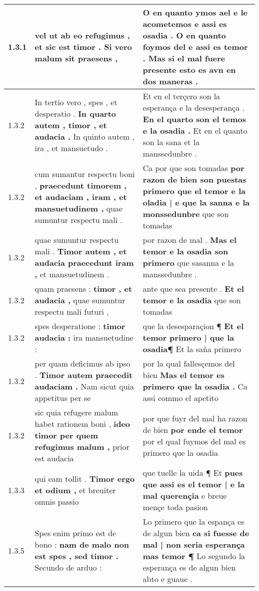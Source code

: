 \begin{tabular}{|p{1cm}|p{6.5cm}|p{6.5cm}|}
1.3.1 & vel ut ab eo refugimus , \textbf{ et sic est timor . } Si vero malum sit praesens , & O en quanto ymos ael e le acometemos e assi es osadia . \textbf{ O en quanto foymos del e assi es temor . } Mas si el mal fuere presente esto es avn en dos maneras . \\\hline
1.3.2 & In tertio vero , spes , et desperatio . \textbf{ In quarto autem , timor , et audacia . } In quinto autem , ira , et mansuetudo . & Et en el terçero son la esperança e la desesperança . \textbf{ En el quarto son el temos e la osadia . } Et en el quanto son la sana et la manssedunbre . \\\hline
1.3.2 & cum sumantur respectu boni , \textbf{ praecedunt timorem , et audaciam , iram , et mansuetudinem , } quae sumuntur respectu mali . & Ca por que son tomadas \textbf{ por razon de bien son puestas primero que el temor e la oladia | e que la sanna e la monssedunbre } que son tomadas \\\hline
1.3.2 & quae sumuntur respectu mali . \textbf{ Timor autem , et audacia praecedunt iram , } et mansuetudinem . & por razon de mal . \textbf{ Mas el temor e la osadia son primero } que sasanna e la manssedunbre . \\\hline
1.3.2 & quam praesens : \textbf{ timor , et audacia , } quae sumuntur respectu mali futuri , & ante que sea presente . \textbf{ Et el temor e la osadia } que son tomadas \\\hline
1.3.2 & spes desperatione : \textbf{ timor audacia : } ira mansuetudine : & que la desesparaçion ¶ \textbf{ Et el temor primero | que la osadia¶ } Et la saña primero \\\hline
1.3.2 & per quam deficimus ab ipso . \textbf{ Timor autem praecedit audaciam . } Nam sicut quia appetitus per se & por la qual fallesçemos del bien \textbf{ Mas el temor es primero que la osadia . } Ca assi commo el apetito \\\hline
1.3.2 & sic quia refugere malum habet rationem boni , \textbf{ ideo timor per quem refugimus malum , } prior est audacia & por que fuyr del mal ha razon de bien \textbf{ por ende el temor } por el qual fuymos del mal es primero que la osadia \\\hline
1.3.3 & qui eam tollit . \textbf{ Timor ergo et odium , } et breuiter omnis passio & que tuelle la uida ¶ Et \textbf{ pues que assi es el temor | e la mal querençia } e breue mençe toda pasion \\\hline
1.3.5 & Spes enim primo est de bono : \textbf{ nam de malo non est spes , sed timor . } Secundo de arduo : & Lo primero que la espança es de algun bien \textbf{ ca si fuesse de mal | non seria esperança mas temor ¶ } Lo segundo la esperança es de algun bien abto e guaue . \\\hline

\end{tabular}

